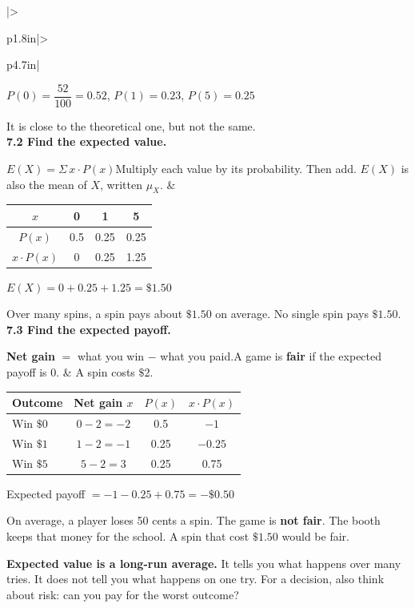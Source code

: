 \documentclass[11pt]{article}
\begin{document}
\begin{tabular}{|>{\raggedright\arraybackslash}p{1.8in}|>{\raggedright\arraybackslash}p{4.7in}|}
$P(0) = \dfrac{52}{100} = 0.52$, \quad $P(1) = 0.23$, \quad $P(5) = 0.25$

It is close to the theoretical one, but not the same. \\ \hline
\textbf{7.2 Find the expected value.}

$E(X) = \Sigma\, x \cdot P(x)$\newline Multiply each value by its probability. Then add. $E(X)$ is also the mean of $X$, written $\mu_X$. &
\begin{tabular}{|c|c|c|c|}\hline
$x$ & 0 & 1 & 5\\ \hline
$P(x)$ & 0.5 & 0.25 & 0.25\\ \hline
$x \cdot P(x)$ & 0 & 0.25 & 1.25\\ \hline
\end{tabular}
\quad $E(X) = 0 + 0.25 + 1.25 = \$1.50$\par\vspace{0.3em}

Over many spins, a spin pays about $\$1.50$ on average. No single spin pays $\$1.50$. \\ \hline
\textbf{7.3 Find the expected payoff.}

\textbf{Net gain} $=$ what you win $-$ what you paid.\newline A game is \textbf{fair} if the expected payoff is 0. &
A spin costs $\$2$.\par\vspace{0.2em}
\begin{tabular}{|l|c|c|c|}\hline
Outcome & Net gain $x$ & $P(x)$ & $x \cdot P(x)$\\ \hline
Win $\$0$ & $0 - 2 = -2$ & 0.5 & $-1$\\ \hline
Win $\$1$ & $1 - 2 = -1$ & 0.25 & $-0.25$\\ \hline
Win $\$5$ & $5 - 2 = 3$ & 0.25 & 0.75\\ \hline
\end{tabular}\par\vspace{0.4em}

Expected payoff $= -1 - 0.25 + 0.75 = -\$0.50$

On average, a player loses 50 cents a spin. The game is \textbf{not fair}. The booth keeps that money for the school. A spin that cost $\$1.50$ would be fair. \\ \hline
\end{tabular}

\vspace{0.6em}
\textbf{Expected value is a long-run average.} It tells you what happens over many tries. It does not tell you what happens on one try. For a decision, also think about risk: can you pay for the worst outcome?
\end{document}
